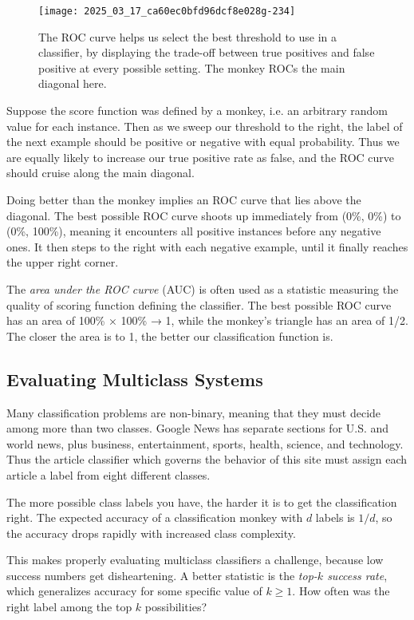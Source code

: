 \documentclass[10pt]{article}
\begin{document}
\begin{figure}[h]
    \centering
    \texttt{[image: 2025\_03\_17\_ca60ec0bfd96dcf8e028g-234]}
    \caption{The ROC curve helps us select the best threshold to use in a classifier, by displaying the trade-off between true positives and false positive at every possible setting. The monkey ROCs the main diagonal here.}
\end{figure}

Suppose the score function was defined by a monkey, i.e. an arbitrary random value for each instance. Then as we sweep our threshold to the right, the label of the next example should be positive or negative with equal probability. Thus we are equally likely to increase our true positive rate as false, and the ROC curve should cruise along the main diagonal.

Doing better than the monkey implies an ROC curve that lies above the diagonal. The best possible ROC curve shoots up immediately from (0\%, 0\%) to (0\%, 100\%), meaning it encounters all positive instances before any negative ones. It then steps to the right with each negative example, until it finally reaches the upper right corner.

The \textit{area under the ROC curve} (AUC) is often used as a statistic measuring the quality of scoring function defining the classifier. The best possible ROC curve has an area of 100\% × 100\% → 1, while the monkey’s triangle has an area of 1/2. The closer the area is to 1, the better our classification function is.

\subsection{Evaluating Multiclass Systems}
Many classification problems are non-binary, meaning that they must decide among more than two classes. Google News has separate sections for U.S. and world news, plus business, entertainment, sports, health, science, and technology. Thus the article classifier which governs the behavior of this site must assign each article a label from eight different classes.

The more possible class labels you have, the harder it is to get the classification right. The expected accuracy of a classification monkey with \(d\) labels is \(1/d\), so the accuracy drops rapidly with increased class complexity.

This makes properly evaluating multiclass classifiers a challenge, because low success numbers get disheartening. A better statistic is the \textit{top-\(k\) success rate}, which generalizes accuracy for some specific value of \(k \geq 1\). How often was the right label among the top \(k\) possibilities?
\end{document}
